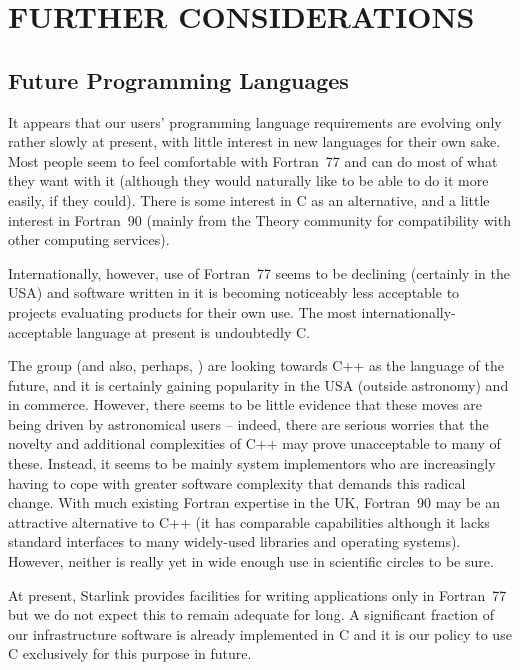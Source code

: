\section{FURTHER CONSIDERATIONS}

\subsection{Future Programming Languages}

It appears that our users' programming language requirements are
evolving only rather slowly at present, with little interest in new
languages for their own sake.  Most people seem to feel comfortable
with Fortran~77 and can do most of what they want with it (although
they would naturally like to be able to do it more easily, if they
could). There is some interest in C as an alternative, and a little
interest in Fortran~90 (mainly from the Theory community for
compatibility with other computing services).

Internationally, however, use of Fortran~77 seems to be declining
(certainly in the USA) and software written in it is becoming
noticeably less acceptable to projects evaluating products for their
own use. The most internationally-acceptable language at present is
undoubtedly C.

The  group (and also, perhaps, ) are
looking towards C++ as the language of the future, and it is certainly
gaining popularity in the USA (outside astronomy) and in
commerce. However, there seems to be little evidence that these moves
are being driven by astronomical users -- indeed, there are serious
worries that the novelty and additional complexities of C++ may prove
unacceptable to many of these.  Instead, it seems to be mainly system
implementors who are increasingly having to cope with greater software
complexity that demands this radical change. With much existing
Fortran expertise in the UK, Fortran~90 may be an attractive
alternative to C++ (it has comparable capabilities although it lacks
standard interfaces to many widely-used libraries and operating
systems). However, neither is really yet in wide enough use in
scientific circles to be sure.

At present, Starlink provides facilities for writing applications only
in Fortran~77 but we do not expect this to remain adequate for long.
A significant fraction of our infrastructure software is already
implemented in C and it is our policy to use C exclusively for this
purpose in future.

